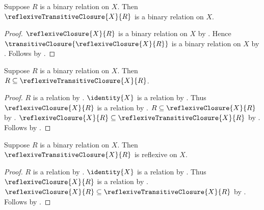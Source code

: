\begin{classification}\label{reflexive_transitive_closure_type}
    Suppose $R$ is a binary relation on $X$.
    Then $\reflexiveTransitiveClosure{X}{R}$ is a binary relation on $X$.
\end{classification}
\begin{proof}
    $\reflexiveClosure{X}{R}$ is a binary relation on $X$
        by .
    Hence $\transitiveClosure{\reflexiveClosure{X}{R}}$
        is a binary relation on $X$
        by .
    Follows by .
\end{proof}

\begin{proposition}\label{reflexive_transitive_closure_contains}
    Suppose $R$ is a binary relation on $X$.
    Then $R\subseteq\reflexiveTransitiveClosure{X}{R}$.
\end{proposition}
\begin{proof}
    $R$ is a relation by .
    $\identity{X}$ is a relation by .
    Thus $\reflexiveClosure{X}{R}$ is a relation
        by .
    $R\subseteq\reflexiveClosure{X}{R}$
        by .
    $\reflexiveClosure{X}{R}\subseteq\reflexiveTransitiveClosure{X}{R}$
        by .
    Follows by .
\end{proof}

\begin{proposition}\label{reflexive_transitive_closure_is_reflexive}
    Suppose $R$ is a binary relation on $X$.
    Then $\reflexiveTransitiveClosure{X}{R}$ is reflexive on $X$.
\end{proposition}
\begin{proof}
    $R$ is a relation by .
    $\identity{X}$ is a relation by .
    Thus $\reflexiveClosure{X}{R}$ is a relation
        by .
    $\reflexiveClosure{X}{R}\subseteq\reflexiveTransitiveClosure{X}{R}$
        by .
    Follows by .
\end{proof}

